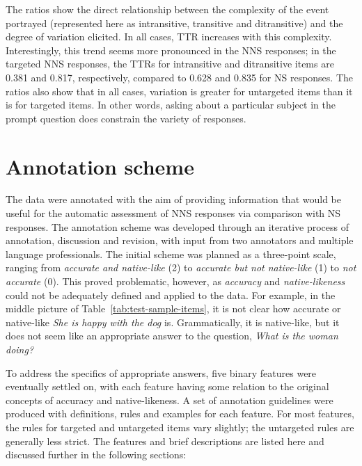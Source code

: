 \documentclass[11pt,a4paper]{article}
\begin{document}
The ratios show the direct relationship between the complexity of the event portrayed (represented here as intransitive, transitive and ditransitive) and the degree of variation elicited. In all cases, TTR increases with this complexity. Interestingly, this trend seems more pronounced in the NNS responses; in the targeted NNS responses, the TTRs for intransitive and ditransitive items are 0.381 and 0.817, respectively, compared to 0.628 and 0.835 for NS responses. The ratios also show that in all cases, variation is greater for untargeted items than it is for targeted items. In other words, asking about a particular subject in the prompt question does constrain the variety of responses.


\section{Annotation scheme}
\label{sec:scheme}
The data were annotated with the aim of providing information that would be useful for the automatic assessment of NNS responses via comparison with NS responses.  
%
%
The annotation scheme was developed through an iterative process of annotation, discussion and revision, with input from two annotators and multiple language professionals. The initial scheme was planned as a three-point scale, ranging from \textit{accurate and native-like} (2) to \textit{accurate but not native-like} (1) to \textit{not accurate} (0). This proved problematic, however, as \textit{accuracy} and \textit{native-likeness} could not be adequately defined and applied to the data.
For example, in the middle picture of Table~\ref{tab:test-sample-items}, it is not clear how accurate or native-like \textit{She is happy with the dog} is.  Grammatically, it is native-like, but it does not seem like an appropriate answer to the question, \textit{What is the woman doing?}

To address the specifics of appropriate answers, five binary features were eventually settled on, with each feature having some relation to the original concepts of accuracy and native-likeness. A set of annotation guidelines were produced with definitions, rules and examples for each feature. For most features, the rules for targeted and untargeted items vary slightly; the untargeted rules are generally less strict. The features and brief descriptions are listed here and discussed further in the following sections:
\end{document}
